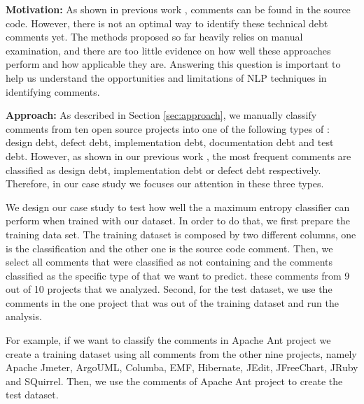 \vspace{3mm}
\noindent\rqi
\vspace{3mm}

\noindent \textbf{Motivation:} As shown in previous work \cite{Potdar2014ICSME, Maldonado2015MTD}, \SATD comments can be found in the source code. However, there is not an optimal way to identify these technical debt comments yet. The methods proposed so far heavily relies on manual examination, and there are too little evidence on how well these approaches perform and how applicable they are. Answering this question is important to help us understand the opportunities and limitations of NLP techniques in identifying \SATD comments. 

\vspace{1mm}
\noindent \textbf{Approach:} As described in Section \ref{sec:approach}, we manually classify comments from ten open source projects into one of the following types of \SATD: design debt, defect debt, implementation debt, documentation debt and test debt. However, as shown in our previous work \cite{Maldonado2015MTD}, the most frequent \SATD comments are classified as design debt, implementation debt or defect debt respectively. Therefore, in our case study we focuses our attention in these three \SATD types. 

We design our case study to test how well the a maximum entropy classifier can perform when trained with our dataset. In order to do that, we first prepare the training data set. The training dataset is composed by two different columns, one is the classification and the other one is the source code comment. Then, we select all comments that were classified as not containing \SATD and the comments classified as the specific type of \SATD  that we want to predict. these comments from 9 out of 10 projects that we analyzed. Second, for the test dataset, we use the comments in the one project that was out of the training dataset and run the analysis.  

For example, if we want to classify the \SATD comments in Apache Ant project we create a training dataset using all comments from the other nine projects, namely Apache Jmeter, ArgoUML, Columba, EMF, Hibernate, JEdit, JFreeChart, JRuby and SQuirrel. Then, we use the comments of Apache Ant project to create the test dataset. 

